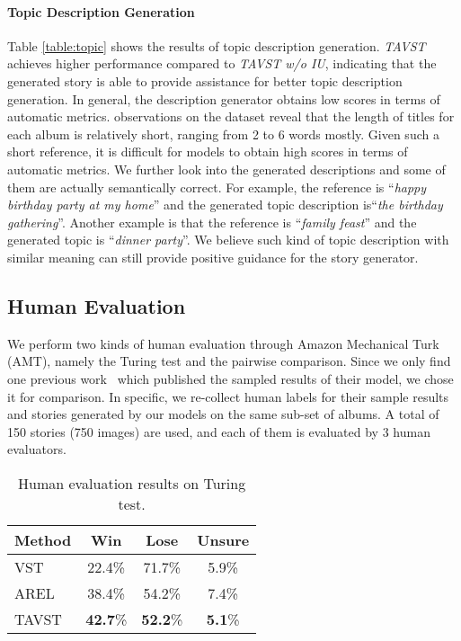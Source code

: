 \documentclass[11pt]{article}
\newcommand{\citep}{\cite}
\begin{document}
\paragraph{Topic Description Generation}
Table \ref{table:topic} shows the results of topic description generation. \emph{TAVST} achieves higher performance compared to \emph{TAVST w/o IU}, indicating that the generated story is able to provide assistance for better topic description generation. In general, the description generator obtains low scores in terms of automatic metrics. observations on the dataset reveal that the length of titles for each album is relatively short, ranging from 2 to 6 words mostly. Given such a short reference, it is difficult for models to obtain high scores in terms of automatic metrics. We further look into the generated descriptions and some of them are actually semantically correct. For example, the reference is ``\textit{happy birthday party at my home}'' and the generated topic description is``\textit{the birthday gathering}''. Another example is that the reference is ``\textit{family feast}'' and the generated topic is ``\textit{dinner party}''. We believe such kind of topic description with similar meaning can still provide positive guidance for the story generator. 


\subsection{Human Evaluation}
We perform two kinds of human evaluation through Amazon Mechanical Turk (AMT), namely the Turing test and the pairwise comparison. Since we only find one previous work~\citep{Wang:2018tda} which published the sampled results of their model, we chose it for comparison. In specific, we re-collect human labels for their sample results and stories generated by our models on the same sub-set of albums. A total of 150 stories (750 images) are used, and each of them is evaluated by 3 human evaluators. 

\begin{wraptable}{r}{0.48\textwidth}

\begin{center}
  \begin{tabular}{ l | c  c  c}
  \hline
    Method     & Win & Lose & Unsure \\
    \hline
    VST     & 22.4\% & 71.7\% & 5.9\% \\
    AREL    & 38.4\% & 54.2\% & 7.4\% \\
    \hline
    TAVST     & \textbf{42.7}\% & \textbf{52.2}\% & \textbf{5.1}\% \\ 
    \hline
  \end{tabular}
    \end{center}


    \label{table:turing}
    \smallskip
    \caption{Human evaluation results on Turing test.}


\end{wraptable}
\end{document}
